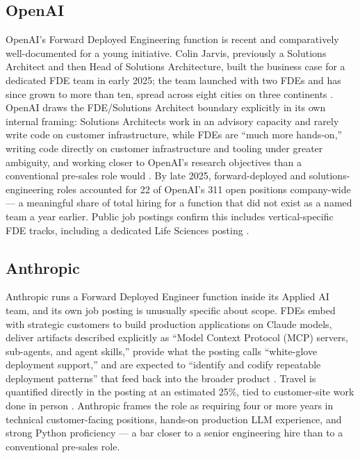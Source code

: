 \documentclass[journal]{IEEEtran}
\begin{document}
\subsection{OpenAI}

OpenAI's Forward Deployed Engineering function is recent and comparatively well-documented for a young initiative. Colin Jarvis, previously a Solutions Architect and then Head of Solutions Architecture, built the business case for a dedicated FDE team in early 2025; the team launched with two FDEs and has since grown to more than ten, spread across eight cities on three continents \cite{orosz2025fde}. OpenAI draws the FDE/Solutions Architect boundary explicitly in its own internal framing: Solutions Architects work in an advisory capacity and rarely write code on customer infrastructure, while FDEs are ``much more hands-on,'' writing code directly on customer infrastructure and tooling under greater ambiguity, and working closer to OpenAI's research objectives than a conventional pre-sales role would \cite{orosz2025fde}. By late 2025, forward-deployed and solutions-engineering roles accounted for 22 of OpenAI's 311 open positions company-wide \cite{schmidt2025servicesledgrowth} --- a meaningful share of total hiring for a function that did not exist as a named team a year earlier. Public job postings confirm this includes vertical-specific FDE tracks, including a dedicated Life Sciences posting \cite{openai2026fdelifesciences}.

\subsection{Anthropic}

Anthropic runs a Forward Deployed Engineer function inside its Applied AI team, and its own job posting is unusually specific about scope. FDEs embed with strategic customers to build production applications on Claude models, deliver artifacts described explicitly as ``Model Context Protocol (MCP) servers, sub-agents, and agent skills,'' provide what the posting calls ``white-glove deployment support,'' and are expected to ``identify and codify repeatable deployment patterns'' that feed back into the broader product \cite{anthropic2026fde}. Travel is quantified directly in the posting at an estimated 25\%, tied to customer-site work done in person \cite{anthropic2026fde}. Anthropic frames the role as requiring four or more years in technical customer-facing positions, hands-on production LLM experience, and strong Python proficiency --- a bar closer to a senior engineering hire than to a conventional pre-sales role.
\end{document}
